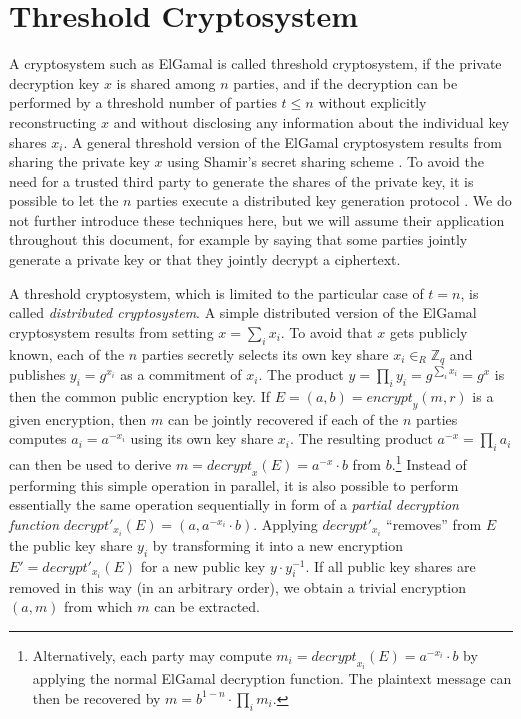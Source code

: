 \documentclass[bibtotoc,halfparskip,oneside]{scrreprt}
\begin{document}
\section{Threshold Cryptosystem} 

A cryptosystem such as ElGamal is called threshold cryptosystem, if the private decryption key $x$ is shared among $n$ parties, and if the decryption can be performed by a threshold number of parties $t \leq n$ without explicitly reconstructing $x$ and without disclosing any information about the individual key shares $x_i$. A general threshold version of the ElGamal cryptosystem results from sharing the private key $x$ using Shamir's secret sharing scheme \cite{pedersen91,shamir79b}. To avoid the need for a trusted third party to generate the shares of the private key, it is possible to let the $n$ parties execute a distributed key generation protocol \cite{GJKR99}. We do not further introduce these techniques here, but we will assume their application throughout this document, for example by saying that some parties jointly generate a private key or that they jointly decrypt a ciphertext.

A threshold cryptosystem, which is limited to the particular case of $t=n$, is called \emph{distributed cryptosystem}. A simple distributed version of the ElGamal cryptosystem results from setting $x=\sum_i x_i$. To avoid that $x$ gets publicly known, each of the $n$ parties secretly selects its own key share $x_i \in_R\mathbb{Z}_q$ and publishes $y_i=g^{x_i}$ as a commitment of $x_i$. The product $y=\prod_i y_i = g^{\sum_i x_i}=g^x$ is then the common public encryption key. If $E=(a,b)=\mathit{encrypt}_y(m,r)$ is a given encryption, then $m$ can be jointly recovered if each of the $n$ parties computes $a_i=a^{-x_i}$ using its own key share $x_i$. The resulting product $a^{-x}=\prod_i a_i$ can then be used to derive $m=\mathit{decrypt}_x(E)=a^{-x}\cdot b$ from $b$.\footnote{Alternatively, each party may compute $m_i=\mathit{decrypt}_{x_i}(E)=a^{-x_i}\cdot b$ by applying the normal ElGamal decryption function. The plaintext message can then be recovered by $m=b^{1-n}\cdot\prod_i m_i$.} Instead of performing this simple operation in parallel, it is also possible to perform essentially the same operation sequentially in form of a \emph{partial decryption function} $\mathit{decrypt}'_{x_i}(E)=(a,a^{-x_i}\cdot b)$. Applying $\mathit{decrypt}'_{x_i}$ ``removes'' from $E$ the public key share $y_i$ by transforming it into a new encryption $E'=\mathit{decrypt}'_{x_i}(E)$ for a new public key $y\cdot y_i^{-1}$. If all public key shares are removed in this way (in an arbitrary order), we obtain a trivial encryption $(a,m)$ from which $m$ can be extracted.
\end{document}
